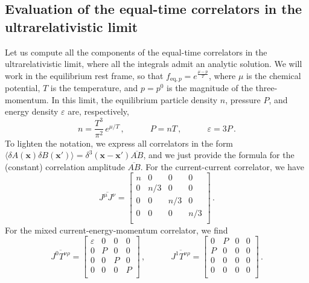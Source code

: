 \documentclass[aps,prd,preprint,nofootinbib,amsmath,amssymb,showpacs,longbibliography,singlecolumn,superscriptaddress,10pt]{revtex4-1}
\theoremstyle{plain}
\theoremstyle{definition}
\begin{document}
\subsection{Evaluation of the equal-time correlators in the ultrarelativistic limit}\label{UUUultra}

Let us compute all the components of the equal-time correlators in the ultrarelativistic limit, where all the integrals admit an analytic solution. We will work in the equilibrium rest frame, so that $f_{\text{eq},p}=e^{\frac{\mu-p}{T}}$, where $\mu$ is the chemical potential, $T$ is the temperature, and $p=p^0$ is the magnitude of the three-momentum. In this limit, the equilibrium particle density $n$, pressure $P$, and energy density $\varepsilon$ are, respectively,
\begin{equation}\label{edaicisono}
    n= \dfrac{T^3}{\pi^2} \, e^{\mu/T}\, , \quad \quad  \quad P=nT \, , \quad \quad \quad \varepsilon=3P \, .
\end{equation}
To lighten the notation, we express all correlators in the form $\langle \delta A(\textbf{x})\delta B(\textbf{x}')\rangle = \delta^3(\textbf{x}-\textbf{x}')\overline{AB}$, and we just provide the formula for the (constant) correlation amplitude $\overline{AB}$. For the current-current correlator, we have
\begin{equation}
    \overline{J^\mu J^\nu}=
    \begin{bmatrix}
n & 0 & 0 & 0 \\
0 & n/3 & 0 & 0 \\
0 & 0 & n/3 & 0 \\
0 & 0 & 0 & n/3 \\
    \end{bmatrix} \, .
\end{equation}
For the mixed current-energy-momentum correlator, we find
\begin{equation}
    \overline{J^0 T^{\nu \rho}}=
    \begin{bmatrix}
\varepsilon & 0 & 0 & 0 \\
0 & P & 0 & 0 \\
0 & 0 & P & 0 \\
0 & 0 & 0 & P \\
    \end{bmatrix} \, , \quad \quad \quad 
    \overline{J^1 T^{\nu \rho}}=
    \begin{bmatrix}
0 & P & 0 & 0 \\
P & 0 & 0 & 0 \\
0 & 0 & 0 & 0 \\
0 & 0 & 0 & 0 \\
    \end{bmatrix} \, .  
\end{equation}
\end{document}
